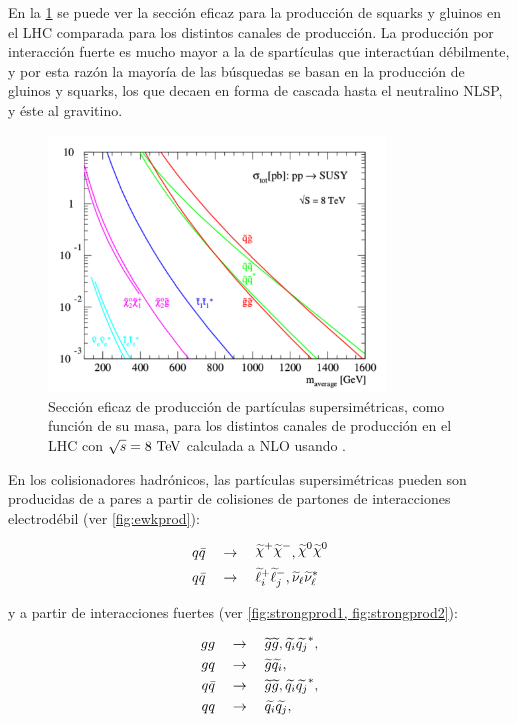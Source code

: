 En la \cref{fig:xs_lhc_8tev} se puede ver la sección eficaz para la producción
de squarks y gluinos en el LHC comparada para los distintos canales de
producción. La producción por interacción fuerte es mucho mayor a la de
spartículas que interactúan débilmente, y por esta razón la mayoría de las
búsquedas se basan en la producción de gluinos y squarks, los que decaen en
forma de cascada hasta el neutralino NLSP, y éste al gravitino.

\begin{figure}[h]
  \centering
  \includegraphics[width=0.8\textwidth]{figures/susy_lhc_xs_8tev}
  \caption{Sección eficaz de producción de partículas supersimétricas, como
    función de su masa, para los distintos canales de producción en el LHC con
    $\sqrt{s} = 8 \tev$ calculada a NLO usando \prospino.}
  \label{fig:xs_lhc_8tev}
\end{figure}

En los colisionadores hadrónicos, las partículas supersimétricas pueden son
producidas de a pares a partir de colisiones de partones de interacciones
electrodébil (ver \cref{fig:ewkprod}):

\begin{align}
  &q\bar{q} \quad \to \quad \chinop \chinom, \nino \nino \label{eq:qq_ewk} \\
  &q\bar{q} \quad \to \quad \susy{\ell}^{+}_{i}\susy{\ell}^{-}_{j}, \susy{\nu}_{\ell}\susy{\nu}^{*}_{\ell} \label{eq:qq_ewk2}
\end{align}

y a partir de interacciones fuertes (ver \cref{fig:strongprod1, fig:strongprod2}):

\begin{align}
  gg \quad &\rightarrow \quad \widetilde{g}\widetilde{g}, \widetilde{q_i}\widetilde{q_j}^{*}, \label{eq:gg} \\
  gq \quad &\rightarrow \quad \widetilde{g}\widetilde{q_i}, \label{eq:gq} \\
  q\bar{q} \quad &\rightarrow \quad \widetilde{g}\widetilde{g}, \widetilde{q_i}\widetilde{q_j}^{*}, \label{eq:qqbar} \\
  qq \quad &\rightarrow \quad \widetilde{q_i}\widetilde{q_j}, \label{eq:qq}
\end{align}

